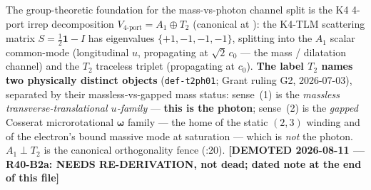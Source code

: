 The group-theoretic foundation for the mass-vs-photon channel split is the K4 4-port irrep decomposition $V_{\text{4-port}} = A_1 \oplus T_2$ (canonical at ): the K4-TLM scattering matrix $S = \tfrac{1}{2}\mathbf{1} - I$ has eigenvalues $\{+1, -1, -1, -1\}$, splitting into the $A_1$ scalar common-mode (longitudinal $u$, propagating at $\sqrt{2}\,c_0$ --- the mass / dilatation channel) and the $T_2$ traceless triplet (propagating at $c_0$). \textbf{The label $T_2$ names two physically distinct objects} (\texttt{def-t2ph01}; Grant ruling G2, 2026-07-03), separated by their massless-vs-gapped mass status: sense~(1) is the \emph{massless transverse-translational $u$-family} --- \textbf{this is the photon}; sense~(2) is the \emph{gapped} Cosserat microrotational $\boldsymbol{\omega}$ family --- the home of the static $(2,3)$ winding and of the electron's bound massive mode at saturation --- which is \emph{not} the photon. $A_1 \perp T_2$ is the canonical orthogonality fence (:20). \textbf{[DEMOTED 2026-08-11 --- R40-B2a: NEEDS RE-DERIVATION, not dead; dated note at the end of this file]}


